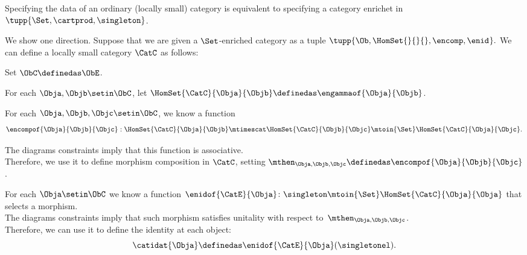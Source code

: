     \begin{exercise}
        \label{ex:every-cat-set}
        Specifying the data of an ordinary (locally small) category is equivalent to specifying a category enrichet in $\tupp{\Set,\cartprod, \singleton}$.
    \end{exercise}
    \begin{solution}
        We show one direction.
        Suppose that we are given a $\Set$-enriched category as a tuple
        $\tupp{\Ob, \HomSet{}{}{}, \encomp, \enid_{}}.
        $
        We can define a locally small category $\CatC$  as follows:
        \begin{compactitem}
            \item Set $\ObC \definedas \ObE$.
            \item For each $\Obja,\Objb\setin\ObC$, let $\HomSet{\CatC}{\Obja}{\Objb} \definedas \engammaof{\Obja}{\Objb}$.
            \item For each $\Obja,\Objb,\Objc \setin \ObC$, we know a function
                  \begin{equation}
                      \encompof{\Obja}{\Objb}{\Objc}:\HomSet{\CatC}{\Obja}{\Objb}\mtimescat \HomSet{\CatC}{\Objb}{\Objc}\mtoin{\Set} \HomSet{\CatC}{\Obja}{\Objc}.
                  \end{equation}

                  The diagrams constraints imply that this function is associative.
                  \\Therefore, we use it to define morphism composition in $\CatC$, setting $\mthen_{\Obja,\Objb,\Objc}\definedas \encompof{\Obja}{\Objb}{\Objc}$.
            \item For each $\Obja\setin\ObC$ we know a function $\enidof{\CatE}{\Obja}\colon\singleton\mtoin{\Set} \HomSet{\CatC}{\Obja}{\Obja}$ that selects a morphism.\\
                  The diagrams constraints imply that such morphism satisfies unitality
                  with respect to~$\mthen_{\Obja,\Objb,\Objc}$. \\Therefore, we can use it to define the identity at each object:
                  \begin{equation}
                      \label{eq:ja-hom}
                      \catidat{\Obja} \definedas \enidof{\CatE}{\Obja}(\singletonel).
                  \end{equation}
        \end{compactitem}
    \end{solution}

